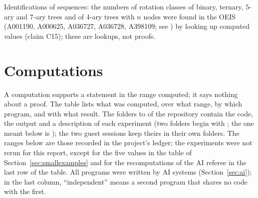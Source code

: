 \documentclass[11pt]{article}
\theoremstyle{definition}
\theoremstyle{remark}
\numberwithin{equation}{section}
\numberwithin{figure}{section}
\begin{document}
\noindent Identifications of sequences: the numbers of rotation classes of binary, ternary, $5$-ary and
$7$-ary trees and of $4$-ary trees with $n$ nodes were found in the OEIS (A001190, A000625, A036727, A036728,
A398109; see \cite{OEISmobiles,OEISA000625}) by looking up computed values (claim C15); these are lookups, not proofs.


\section{Computations}\label{sec:computations}
A computation supports a statement in the range computed; it says nothing about a proof. The table lists
what was computed, over what range, by which program, and with what result. The folders
 to  of the repository contain the code, the output and a
description of each experiment (two folders begin with ; the one meant below is
); the two guest sessions keep theirs in their own folders. The ranges below are
those recorded in the project's ledger; the experiments were not rerun for this report, except for the five
values in the table of Section~\ref{sec:smallexamples} and for the recomputations of the AI referee in the
last row of the table. All programs were written by AI systems
(Section~\ref{sec:ai}); in the last column, ``independent'' means a second program that shares no code with
the first.
\end{document}
